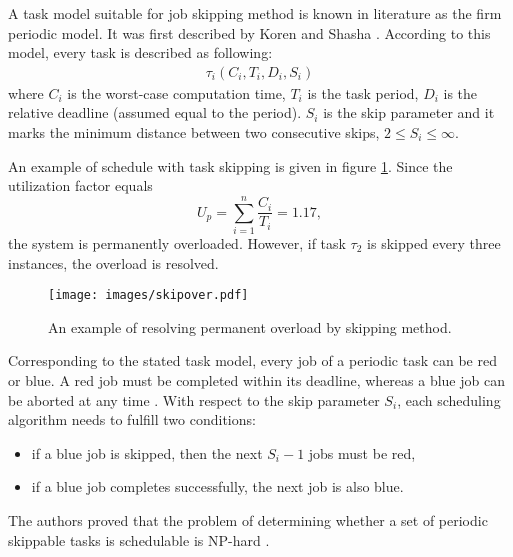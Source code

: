 A task model suitable for job skipping method is known in literature as the firm periodic model.
It was first described by Koren and Shasha \cite{koren1995skip}.
According to this model, every task is described as following:
\begin{align*}
\tau_i(C_i, T_i, D_i, S_i)
\end{align*}
where $C_i$ is the worst-case computation time, $T_i$ is the task period, $D_i$ is the relative deadline (assumed equal to the period). $S_i$ is the skip parameter and it marks the minimum distance between two consecutive skips, \(2 \leq S_i \leq \infty\).

An example of schedule with task skipping is given in figure \ref{skipover}. 
Since the utilization factor equals 
\begin{equation*}
U_p = \sum_{i=1}^{n} \frac{C_i}{T_i} = 1.17,
\end{equation*}
the system is permanently overloaded. 
However, if task \(\tau_2\) is skipped every three instances, the overload is resolved.
\\
\begin{figure}[ht]
    \centering
    \texttt{[image: images/skipover.pdf]}
    \caption{An example of resolving permanent overload by skipping method.}
    \label{skipover}
\end{figure}

Corresponding to the stated task model, every job of a periodic task can be red or blue.
A red job must be completed within its deadline, whereas a blue job can be aborted at any time 
\cite{buttazzo2011hard}. 
With respect to the skip parameter $S_i$, each scheduling algorithm needs to fulfill two conditions:
\begin{itemize}
	\item if a blue job is skipped, then the next \(S_i - 1\) jobs must be red,
	\item if a blue job completes successfully, the next job is also blue.
\end{itemize}
The authors proved that the problem of determining whether a set of periodic skippable tasks is schedulable is NP-hard \cite{koren1995skip}.


